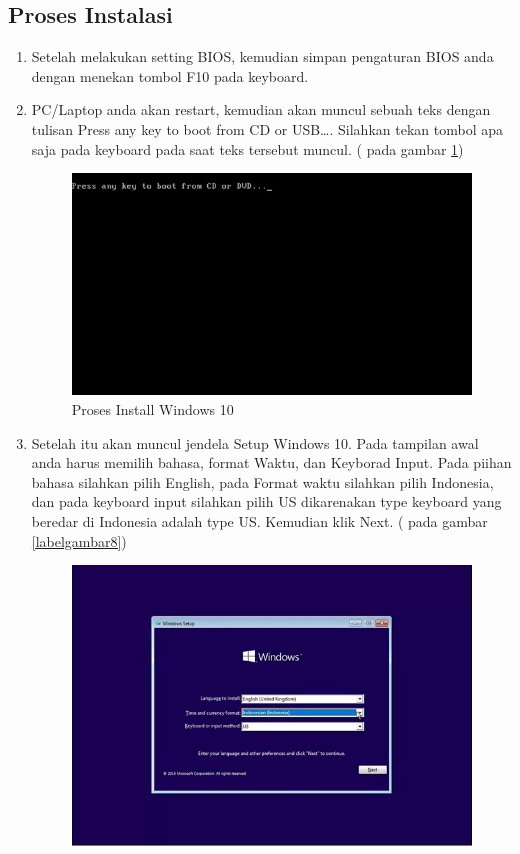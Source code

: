 \subsection{Proses Instalasi}
\begin{enumerate}
  \item Setelah melakukan setting BIOS, kemudian simpan pengaturan BIOS anda dengan menekan tombol F10 pada keyboard.
  \item PC/Laptop anda akan restart, kemudian akan muncul sebuah teks dengan tulisan Press any key to boot from CD or USB…. Silahkan tekan tombol apa saja pada keyboard pada saat teks tersebut muncul. ( pada gambar \ref{labelgambar7})
      \begin{figure}[h!]
	\centering
	\includegraphics[scale=0.4]{figures/1.jpg}
	\caption{Proses Install Windows 10}
	\label{labelgambar7}
	\end{figure}
  \item Setelah itu akan muncul jendela Setup Windows 10. Pada tampilan awal anda harus memilih bahasa, format Waktu, dan Keyborad Input. Pada piihan bahasa silahkan pilih English, pada Format waktu silahkan pilih Indonesia, dan pada keyboard input silahkan pilih US dikarenakan type keyboard yang beredar di Indonesia adalah type US. Kemudian klik Next. ( pada gambar \ref{labelgambar8})
      \begin{figure}[h!]
	\centering
	\includegraphics[scale=0.4]{figures/2.JPG}

\end{figure}
\end{enumerate}

